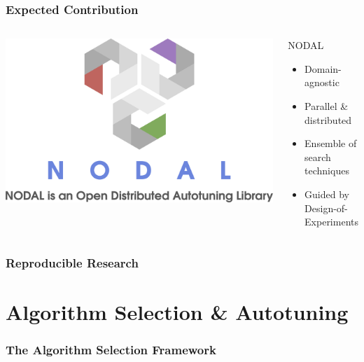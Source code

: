 \documentclass[10pt, compress, aspectratio=169]{beamer}
\begin{document}
\begin{frame}
    \frametitle{Expected Contribution}
    \begin{columns}
        \begin{center}
            \includegraphics[width=\columnwidth]{logo}
        \end{center}

        \begin{block}{NODAL}
            \begin{itemize}
                \item \alert{Domain-agnostic}
                \item \alert{Parallel \& distributed}
                \item \alert{Ensemble} of search techniques
                \item Guided by \alert{Design-of-Experiments}
            \end{itemize}
        \end{block}

    \end{columns}
\end{frame}

\begin{frame}
    \frametitle{Reproducible Research}
\end{frame}

\section{Algorithm Selection \& Autotuning}

\begin{frame}
    \frametitle{The Algorithm Selection Framework}
\end{frame}
\end{document}
